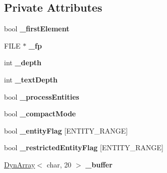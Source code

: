 \subsection*{Private Attributes}
\begin{DoxyCompactItemize}
\item 
\mbox{\label{classtinyxml2_1_1XMLPrinter_abbd7ac45d97ae5eceec12d6c058119f9}} 
bool {\bfseries \+\_\+first\+Element}
\item 
\mbox{\label{classtinyxml2_1_1XMLPrinter_a79d91decf17990f7ce18b592f3fdf44e}} 
F\+I\+LE $\ast$ {\bfseries \+\_\+fp}
\item 
\mbox{\label{classtinyxml2_1_1XMLPrinter_a19cd59a9dbe4b666264803fb91ac8ec1}} 
int {\bfseries \+\_\+depth}
\item 
\mbox{\label{classtinyxml2_1_1XMLPrinter_a3c5a442e57131faefde97188e92144f3}} 
int {\bfseries \+\_\+text\+Depth}
\item 
\mbox{\label{classtinyxml2_1_1XMLPrinter_a3e27c4b4fe791a96e4e139b5034e190b}} 
bool {\bfseries \+\_\+process\+Entities}
\item 
\mbox{\label{classtinyxml2_1_1XMLPrinter_a7bc067aa3f0dcee68e4ac75e19117bd0}} 
bool {\bfseries \+\_\+compact\+Mode}
\item 
\mbox{\label{classtinyxml2_1_1XMLPrinter_a334eb34c43f21daebef9341b4768c275}} 
bool {\bfseries \+\_\+entity\+Flag} \mbox{[}E\+N\+T\+I\+T\+Y\+\_\+\+R\+A\+N\+GE\mbox{]}
\item 
\mbox{\label{classtinyxml2_1_1XMLPrinter_a5df242509d42ae1c9128924121ebe093}} 
bool {\bfseries \+\_\+restricted\+Entity\+Flag} \mbox{[}E\+N\+T\+I\+T\+Y\+\_\+\+R\+A\+N\+GE\mbox{]}
\item 
\mbox{\label{classtinyxml2_1_1XMLPrinter_a19fca2e934576a892fefe2f602874d59}} 
\mbox{\hyperlink{classtinyxml2_1_1DynArray}{Dyn\+Array}}$<$ char, 20 $>$ {\bfseries \+\_\+buffer}
\end{DoxyCompactItemize}


